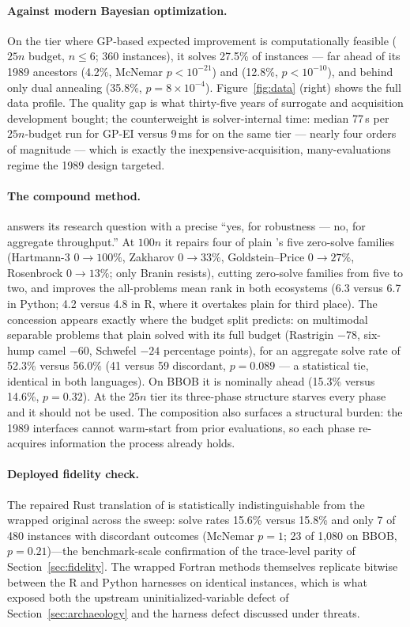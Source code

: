 \paragraph{Against modern Bayesian optimization.} On the tier where
GP-based expected improvement is computationally feasible ($25n$
budget, $n\le 6$; 360 instances), it solves 27.5\% of instances ---
far ahead of its 1989 ancestors  (4.2\%, McNemar
$p<10^{-21}$) and  (12.8\%, $p<10^{-10}$), and behind
only dual annealing (35.8\%, $p=8\times10^{-4}$). Figure~\ref{fig:data}
(right) shows the full data profile. The quality gap is what
thirty-five years of surrogate and acquisition development bought; the
counterweight is solver-internal time: median 77\,s per $25n$-budget
run for GP-EI versus 9\,ms for  on the same tier ---
nearly four orders of magnitude --- which is exactly the
inexpensive-acquisition, many-evaluations regime the 1989 design
targeted.

\paragraph{The compound method.}  answers its research
question with a precise ``yes, for robustness --- no, for aggregate
throughput.'' At $100n$ it repairs four of plain 's five
zero-solve families (Hartmann-3 $0\to100\%$, Zakharov $0\to33\%$,
Goldstein--Price $0\to27\%$, Rosenbrock $0\to13\%$; only Branin
resists), cutting zero-solve families from five to two, and improves
the all-problems mean rank in both ecosystems (6.3 versus 6.7 in
Python; 4.2 versus 4.8 in R, where it overtakes plain  for
third place). The concession appears exactly where the budget split
predicts: on multimodal separable problems that plain 
solved with its full budget (Rastrigin $-78$, six-hump camel $-60$,
Schwefel $-24$ percentage points), for an aggregate solve rate of
52.3\% versus 56.0\% (41 versus 59 discordant, $p=0.089$ --- a
statistical tie, identical in both languages). On BBOB it is nominally
ahead (15.3\% versus 14.6\%, $p=0.32$). At the $25n$ tier its
three-phase structure starves every phase and it should not be used.
The composition also surfaces a structural burden: the 1989 interfaces
cannot warm-start from prior evaluations, so each phase re-acquires
information the process already holds.

\paragraph{Deployed fidelity check.} The repaired Rust translation of
 is statistically indistinguishable from the wrapped
original across the sweep: solve rates 15.6\% versus 15.8\% and only
7 of 480 instances with discordant outcomes (McNemar $p=1$; 23 of
1{,}080 on BBOB, $p=0.21$)---the benchmark-scale confirmation of the
trace-level parity of Section~\ref{sec:fidelity}. The wrapped Fortran
methods themselves replicate bitwise between the R and Python harnesses
on identical instances, which is what exposed both the upstream
uninitialized-variable defect of Section~\ref{sec:archaeology} and the
harness defect discussed under threats.

